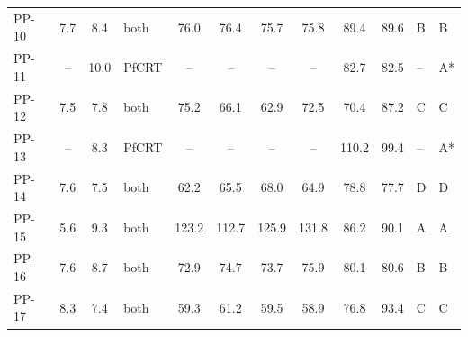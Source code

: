 \begin{table}[ht!]
{\begin{tabular}{l S[table-format=2.1] S[table-format=2.1] l S[table-format=3.1] S[table-format=3.1] S[table-format=3.1] S[table-format=3.1] S[table-format=3.1] S[table-format=3.1] l l}
PP-10 & 7.7 & 8.4 & both & 76.0 & 76.4 & 75.7 & 75.8 & 89.4 & 89.6 & B & B \\
PP-11 & {--} & 10.0 & PfCRT & {--} & {--} & {--} & {--} & 82.7 & 82.5 & {--} & A* \\
PP-12 & 7.5 & 7.8 & both & 75.2 & 66.1 & 62.9 & 72.5 & 70.4 & 87.2 & C & C \\
PP-13 & {--} & 8.3 & PfCRT & {--} & {--} & {--} & {--} & 110.2 & 99.4 & {--} & A* \\
PP-14 & 7.6 & 7.5 & both & 62.2 & 65.5 & 68.0 & 64.9 & 78.8 & 77.7 & D & D \\
PP-15 & 5.6 & 9.3 & both & 123.2 & 112.7 & 125.9 & 131.8 & 86.2 & 90.1 & A & A \\
PP-16 & 7.6 & 8.7 & both & 72.9 & 74.7 & 73.7 & 75.9 & 80.1 & 80.6 & B & B \\
PP-17 & 8.3 & 7.4 & both & 59.3 & 61.2 & 59.5 & 58.9 & 76.8 & 93.4 & C & C \\
\bottomrule
\end{tabular}%
}
\end{table}
